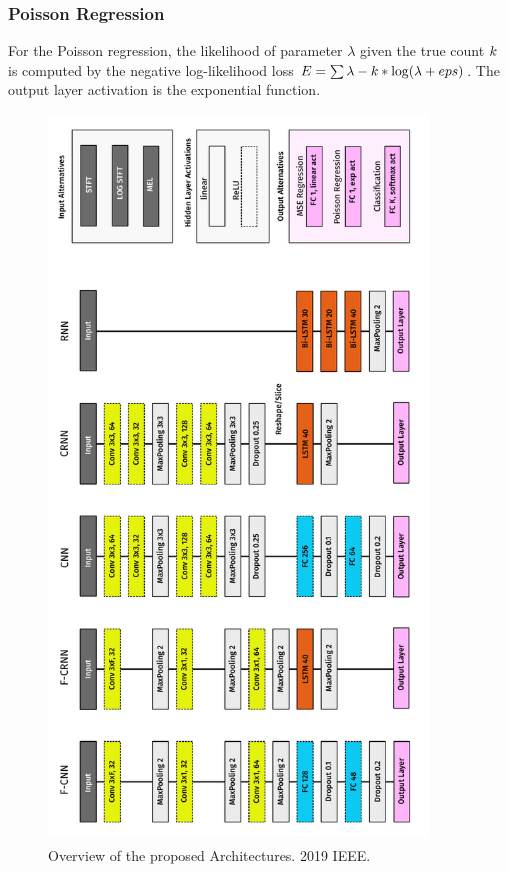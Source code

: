 \subsubsection{Poisson Regression}
For the Poisson regression, the likelihood of parameter \(\lambda \) given the true count \(k \) is computed by the negative log-likelihood loss \(E = \sum \lambda - k * \log(\lambda + eps)\). The output layer activation is the exponential function.

\begin{figure}[!hp]
\centering
\includegraphics[width=0.9\textwidth]{Chapters/08_Analysis_CountNet/figures/networkoverview.pdf}
\caption{Overview of the proposed Architectures. \textsuperscript{\textregistered} 2019 IEEE.}%
\label{fig:networkoverview}%
\end{figure}

